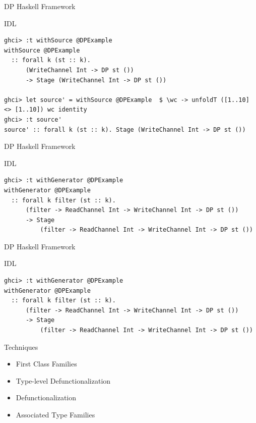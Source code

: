 \documentclass{beamer}
\begin{document}
  \begin{frame}[fragile]{DP Haskell Framework}
    \begin{block}{IDL}
      \begin{verbatim}      
ghci> :t withSource @DPExample
withSource @DPExample
  :: forall k (st :: k).
      (WriteChannel Int -> DP st ())
      -> Stage (WriteChannel Int -> DP st ())
      
ghci> let source' = withSource @DPExample  $ \wc -> unfoldT ([1..10] <> [1..10]) wc identity
ghci> :t source'
source' :: forall k (st :: k). Stage (WriteChannel Int -> DP st ())
    \end{verbatim}
  \end{block}
  \end{frame}

  \begin{frame}[fragile]{DP Haskell Framework}
    \begin{block}{IDL}
      \begin{verbatim}      
ghci> :t withGenerator @DPExample
withGenerator @DPExample
  :: forall k filter (st :: k).
      (filter -> ReadChannel Int -> WriteChannel Int -> DP st ())
      -> Stage
          (filter -> ReadChannel Int -> WriteChannel Int -> DP st ())    
    \end{verbatim}
  \end{block}
  \end{frame}

  \begin{frame}[fragile]{DP Haskell Framework}
    \begin{block}{IDL}
      \begin{verbatim}      
ghci> :t withGenerator @DPExample
withGenerator @DPExample
  :: forall k filter (st :: k).
      (filter -> ReadChannel Int -> WriteChannel Int -> DP st ())
      -> Stage
          (filter -> ReadChannel Int -> WriteChannel Int -> DP st ())    
    \end{verbatim}
  \end{block}
  \begin{block}{Techniques}
    \begin{itemize}
      \item First Class Families
      \item Type-level Defunctionalization 
      \item Defunctionalization
      \item Associated Type Families
    \end{itemize}
  \end{block}
  \end{frame}
\end{document}

